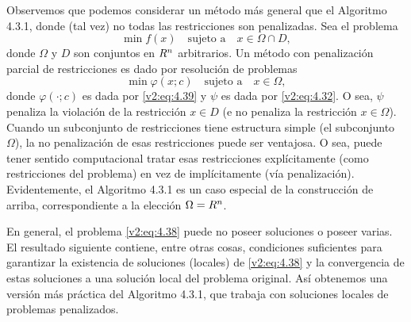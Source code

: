 Observemos que podemos considerar un método más general que el Algoritmo 4.3.1, donde (tal vez) no todas las restricciones son penalizadas. Sea el problema
\[
    \min f(x) \quad \text{sujeto a} \quad x \in \Omega \cap D,
\]
donde $\Omega$ y $D$ son conjuntos en $R^n$ arbitrarios. Un método con penalización parcial de restricciones es dado por resolución de problemas
\[
    \min \varphi(x; c) \quad \text{sujeto a} \quad x \in \Omega,
\]
donde $\varphi(\cdot; c)$ es dada por \eqref{v2:eq:4.39} y $\psi$ es dada por \eqref{v2:eq:4.32}. O sea, $\psi$ penaliza la violación de la restricción $x \in D$ (e no penaliza la restricción $x \in \Omega$). Cuando un subconjunto de restricciones tiene estructura simple (el subconjunto $\Omega$), la no penalización de esas restricciones puede ser ventajosa. O sea, puede tener sentido computacional tratar esas restricciones explícitamente (como restricciones del problema) en vez de implícitamente (vía penalización). Evidentemente, el Algoritmo 4.3.1 es un caso especial de la construcción de arriba, correspondiente a la elección $\Omega = R^n$.


En general, el problema \eqref{v2:eq:4.38} puede no poseer soluciones o poseer varias. El resultado siguiente contiene, entre otras cosas, condiciones suficientes para garantizar la existencia de soluciones (locales) de \eqref{v2:eq:4.38} y la convergencia de estas soluciones a una solución local del problema original. Así obtenemos una versión más práctica del Algoritmo 4.3.1, que trabaja con soluciones locales de problemas penalizados.


